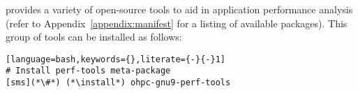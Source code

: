 \OHPC{} provides a variety of open-source tools to aid in application 
performance analysis (refer to Appendix~\ref{appendix:manifest} for a listing
of available packages). This group of tools can be installed as follows:

\begin{lstlisting}[language=bash,keywords={},literate={-}{-}1]
# Install perf-tools meta-package
[sms](*\#*) (*\install*) ohpc-gnu9-perf-tools
\end{lstlisting}
